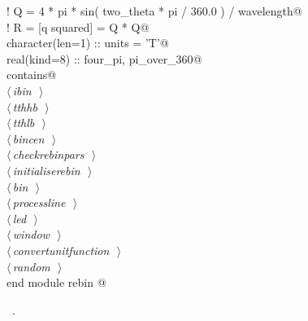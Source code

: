 \documentclass[10pt,a4paper,notitlepage]{article}
\begin{document}
\begin{flushleft}
\begin{minipage}{\linewidth}
\begin{list}{}{}
\mbox{}\verb@      ! Q = 4 * pi * sin( two_theta * pi / 360.0 ) / wavelength@\\
\mbox{}\verb@      ! R = [q squared] = Q * Q@\\
\mbox{}\verb@      character(len=1) :: units = 'T'@\\
\mbox{}\verb@      real(kind=8) :: four_pi, pi_over_360@\\
\mbox{}\verb@      contains@\\
\mbox{}\verb@@\hbox{$\langle\,${\it ibin}\nobreak\ {\footnotesize {}}$\,\rangle$}\verb@@\\
\mbox{}\verb@@\hbox{$\langle\,${\it tthhb}\nobreak\ {\footnotesize {}}$\,\rangle$}\verb@@\\
\mbox{}\verb@@\hbox{$\langle\,${\it tthlb}\nobreak\ {\footnotesize {}}$\,\rangle$}\verb@@\\
\mbox{}\verb@@\hbox{$\langle\,${\it bincen}\nobreak\ {\footnotesize {}}$\,\rangle$}\verb@@\\
\mbox{}\verb@@\hbox{$\langle\,${\it checkrebinpars}\nobreak\ {\footnotesize {}}$\,\rangle$}\verb@@\\
\mbox{}\verb@@\hbox{$\langle\,${\it initialiserebin}\nobreak\ {\footnotesize {}}$\,\rangle$}\verb@@\\
\mbox{}\verb@@\hbox{$\langle\,${\it bin}\nobreak\ {\footnotesize {}}$\,\rangle$}\verb@@\\
\mbox{}\verb@@\hbox{$\langle\,${\it processline}\nobreak\ {\footnotesize {}}$\,\rangle$}\verb@@\\
\mbox{}\verb@@\hbox{$\langle\,${\it led}\nobreak\ {\footnotesize {}}$\,\rangle$}\verb@@\\
\mbox{}\verb@@\hbox{$\langle\,${\it window}\nobreak\ {\footnotesize {}}$\,\rangle$}\verb@@\\
\mbox{}\verb@@\hbox{$\langle\,${\it convertunitfunction}\nobreak\ {\footnotesize {}}$\,\rangle$}\verb@@\\
\mbox{}\verb@@\hbox{$\langle\,${\it random}\nobreak\ {\footnotesize {}}$\,\rangle$}\verb@@\\
\mbox{}\verb@      end module rebin                                                       @{\NWsep}
\end{list}
\vspace{-1.5ex}
\footnotesize
\begin{list}{}{\setlength{\itemsep}{-\parsep}\setlength{\itemindent}{-\leftmargin}}
\item \NWtxtMacroRefIn\ .

\item{}
\end{list}
\end{minipage}\vspace{4ex}
\end{flushleft}
\end{document}
